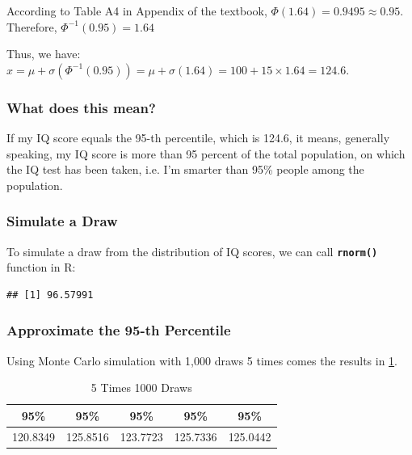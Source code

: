 \documentclass[12pt,letterpaper,titlepage,en-US]{article}
\begin{document}
According to Table A4 in Appendix of the textbook, $\Phi(1.64) = 0.9495 \approx 0.95$.
Therefore, $\Phi^{-1}(0.95) = 1.64$

Thus, we have: $x = \mu + \sigma(\Phi^{-1}(0.95)) = \mu + \sigma(1.64) = 100 + 15 \times 1.64 = 124.6$.

\subsubsection{What does this mean?}
If my IQ score equals the 95-th percentile, which is 124.6, it means, generally speaking,
my IQ score is more than 95 percent of the total population, on which the IQ test
has been taken, i.e. I'm smarter than 95\% people among the population.

\subsubsection{Simulate a Draw}
To simulate a draw from the distribution of IQ scores, we can call \textbf{\texttt{rnorm()}} function in R:
\begin{knitrout}
\color{fgcolor}
\begin{kframe}
\begin{alltt}
\hlstd{(}\hlstd{,}  \hlstd{=} \hlstd{,}  \hlstd{=} \hlstd{)}
\end{alltt}
\begin{verbatim}
## [1] 96.57991
\end{verbatim}
\end{kframe}
\end{knitrout}

\subsubsection{Approximate the 95-th Percentile}
Using Monte Carlo simulation with 1,000 draws 5 times comes the results in \cref{21000}.
\begin{table}[H]
\centering
\begin{tabular}{|c|c|c|c|c|}
\hline
     95\%      &95\%      &95\%      &95\%      &95\% \\\hline
120.8349 &125.8516 &123.7723 &125.7336 &125.0442\\\hline
\end{tabular}
\caption{5 Times 1000 Draws}\label{21000}
\end{table}
\end{document}
